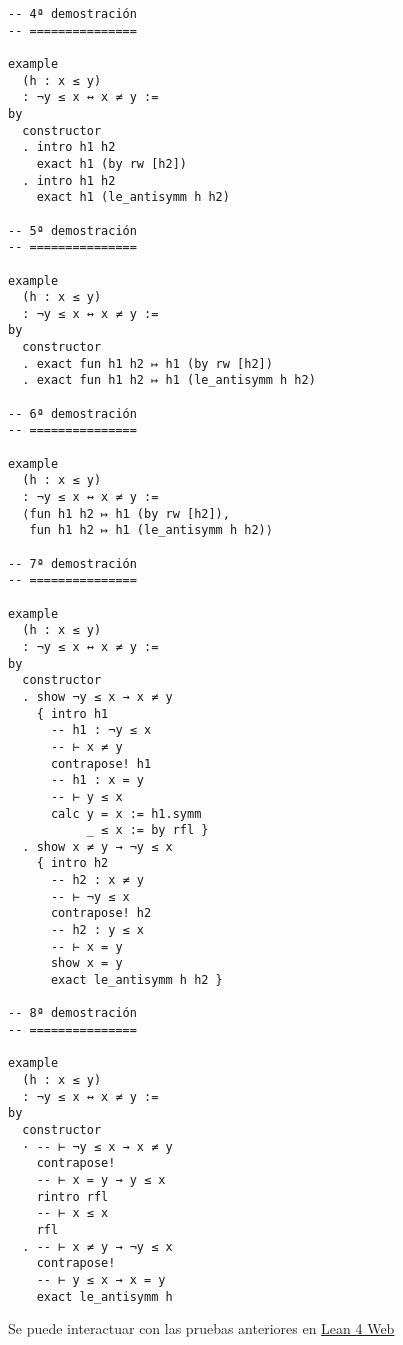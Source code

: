 \begin{verbatim}
-- 4ª demostración
-- ===============

example
  (h : x ≤ y)
  : ¬y ≤ x ↔ x ≠ y :=
by
  constructor
  . intro h1 h2
    exact h1 (by rw [h2])
  . intro h1 h2
    exact h1 (le_antisymm h h2)

-- 5ª demostración
-- ===============

example
  (h : x ≤ y)
  : ¬y ≤ x ↔ x ≠ y :=
by
  constructor
  . exact fun h1 h2 ↦ h1 (by rw [h2])
  . exact fun h1 h2 ↦ h1 (le_antisymm h h2)

-- 6ª demostración
-- ===============

example
  (h : x ≤ y)
  : ¬y ≤ x ↔ x ≠ y :=
  ⟨fun h1 h2 ↦ h1 (by rw [h2]),
   fun h1 h2 ↦ h1 (le_antisymm h h2)⟩

-- 7ª demostración
-- ===============

example
  (h : x ≤ y)
  : ¬y ≤ x ↔ x ≠ y :=
by
  constructor
  . show ¬y ≤ x → x ≠ y
    { intro h1
      -- h1 : ¬y ≤ x
      -- ⊢ x ≠ y
      contrapose! h1
      -- h1 : x = y
      -- ⊢ y ≤ x
      calc y = x := h1.symm
           _ ≤ x := by rfl }
  . show x ≠ y → ¬y ≤ x
    { intro h2
      -- h2 : x ≠ y
      -- ⊢ ¬y ≤ x
      contrapose! h2
      -- h2 : y ≤ x
      -- ⊢ x = y
      show x = y
      exact le_antisymm h h2 }

-- 8ª demostración
-- ===============

example
  (h : x ≤ y)
  : ¬y ≤ x ↔ x ≠ y :=
by
  constructor
  · -- ⊢ ¬y ≤ x → x ≠ y
    contrapose!
    -- ⊢ x = y → y ≤ x
    rintro rfl
    -- ⊢ x ≤ x
    rfl
  . -- ⊢ x ≠ y → ¬y ≤ x
    contrapose!
    -- ⊢ y ≤ x → x = y
    exact le_antisymm h
\end{verbatim}
Se puede interactuar con las pruebas anteriores en \href{https://lean.math.hhu.de/\#url=https://raw.githubusercontent.com/jaalonso/Calculemus2/main/src/CNS\_de\_distintos.lean}{Lean 4 Web}

